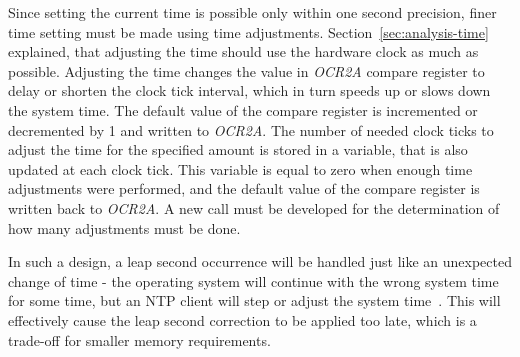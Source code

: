 Since setting the current time is possible only within one second precision,
finer time setting must be made using time adjustments.
Section~\ref{sec:analysis-time} explained, that adjusting the time
should use the hardware clock as much as possible.
Adjusting the time changes the value in {\it{OCR2A}} compare register
to delay or shorten the clock tick interval,
which in turn speeds up or slows down the system time.
The default value of the compare register is incremented or decremented by 1
and written to {\it{OCR2A}}.
The number of needed clock ticks to adjust the time for the specified amount
is stored in a variable, that is also updated at each clock tick.
This variable is equal to zero when enough time adjustments were performed,
and the default value of the compare register is written back to {\it{OCR2A}}.
A new call must be developed for the determination of how many adjustments must be done.

In such a design, a leap second occurrence will be handled just like an unexpected change of time -
the operating system will continue with the wrong system time for some time,
but an NTP client will step or adjust the system time~\cite{ntp-faq}.
This will effectively cause the leap second correction to be applied too late,
which is a trade-off for smaller memory requirements.



